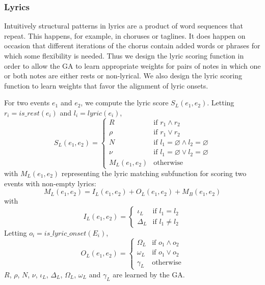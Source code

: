 \documentclass[phd,electronic,oneside,twosidetoc,letterpaper,chaptercenter,parttop,lof,lot]{byumsphd}
\begin{document}

\subsubsection{Lyrics}

Intuitively structural patterns in lyrics are a product of word sequences that repeat. This happens, for example, in choruses or taglines. It does happen on occasion that different iterations of the chorus contain added words or phrases for which some flexibility is needed. Thus we design the lyric scoring function in order to allow the GA to learn appropriate weights for pairs of notes in which one or both notes are either rests or non-lyrical. We also design the lyric scoring function to learn weights that favor the alignment of lyric onsets.

For two events $e_1$ and $e_2$, we compute the lyric score $S_L(e_1,e_2)$. Letting $r_i = is\_rest(e_i)$ and $l_i = lyric(e_i)$,
\[
  S_L(e_1,e_2) =
  \begin{cases}
	R & \text{if } r_1 \land r_2 \\
	\rho & \text{if } r_1 \lor r_2 \\ 
    N & \text{if } l_1 = \varnothing \land l_2 = \varnothing\\
    \nu & \text{if } l_1 = \varnothing \lor l_2 = \varnothing \\
    M_L(e_1,e_2) & \text{otherwise}
  \end{cases}
\]
\noindent with $M_L(e_1,e_2)$ representing the lyric matching subfunction for scoring two events with non-empty lyrics:
\[ M_L(e_1,e_2) = I_L(e_1,e_2) + O_L(e_1,e_2) + M_B(e_1,e_2) \]
\noindent with
\[ I_L(e_1,e_2) = 
  \begin{cases}
  	\iota_L & \text{if } l_1 = l_2 \\
    \Delta_L & \text{if } l_1 \neq l_2
  \end{cases}
\]
\noindent Letting $o_i = is\_lyric\_onset(E_i)$,
\[ O_L(e_1,e_2) = 
  \begin{cases}
  	\Omega_L & \text{if } o_1 \land o_2 \\
    \omega_L & \text{if } o_1 \lor o_2 \\
    \gamma_L & \text{otherwise}
  \end{cases}
\]
\noindent $R$, $\rho$, $N$, $\nu$, $\iota_L$, $\Delta_L$, $\Omega_L$, $\omega_L$ and $\gamma_L$ are learned by the GA.
\end{document}
